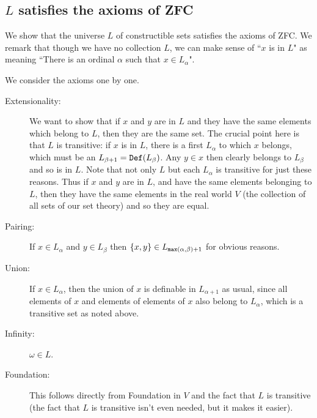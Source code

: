 \documentclass[12pt]{book}
\begin{document}
\newpage

\subsection{$L$ satisfies the axioms of ZFC}

We show that the universe $L$ of constructible sets satisfies the axioms of ZFC.  We remark that though we have no collection $L$, we can make sense of ``$x$ is in $L$" as meaning
``There is an ordinal $\alpha$ such that $x \in L_{\alpha}$".

We consider the axioms one by one.

\begin{description}

\item[Extensionality:]  We want to show that if $x$ and $y$ are in $L$ and they have the same elements which belong to $L$, then they are the same set.  The crucial point here is that
$L$ is transitive:  if $x$ is in $L$, there is a first $L_{\alpha}$ to which $x$ belongs, which must be an $L_{\beta+1} = {\tt Def}(L_{\beta})$.  Any $y \in x$ then clearly belongs to
$L_{\beta}$ and so is in $L$.  Note that not only $L$ but each $L_{\alpha}$ is transitive for just these reasons.  Thus if $x$ and $y$ are in $L$, and have the same elements belonging to $L$, then they have the same elements in the real world $V$ (the collection of all sets of our set theory) and so they are equal.

\item[Pairing:]  If $x \in L_{\alpha}$ and $y \in L_{\beta}$ then $\{x,y\} \in L_{{\tt max}(\alpha,\beta)+1}$ for obvious reasons.

\item[Union:]  If $x \in L_{\alpha}$, then the union of $x$ is definable in $L_{\alpha+1}$ as usual, since all elements of $x$ and elements of elements of $x$ also belong to $L_{\alpha}$,
which is a transitive set as noted above.

\item[Infinity:]  $\omega \in L$.

\item[Foundation:]  This follows directly from Foundation in $V$ and the fact that $L$ is transitive (the fact that $L$ is transitive isn't even needed, but it makes it easier).


\end{description}
\end{document}
